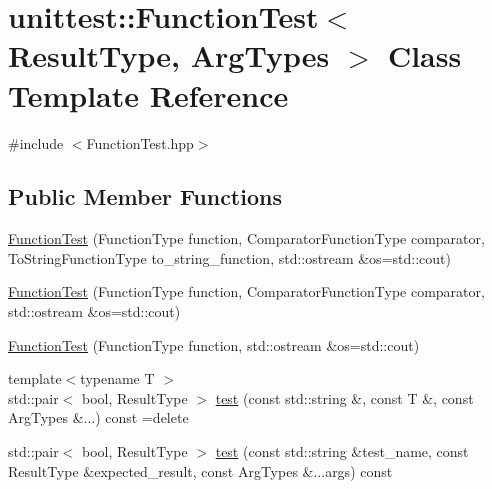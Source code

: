 \hypertarget{classunittest_1_1_function_test}{}\section{unittest\+:\+:Function\+Test$<$ Result\+Type, Arg\+Types $>$ Class Template Reference}
\label{classunittest_1_1_function_test}


{\ttfamily \#include $<$Function\+Test.\+hpp$>$}

\subsection*{Public Member Functions}
\begin{DoxyCompactItemize}
\item 
\hyperlink{classunittest_1_1_function_test_a9bb46bed56452a5354848e7d5744c715}{Function\+Test} (Function\+Type function, Comparator\+Function\+Type comparator, To\+String\+Function\+Type to\+\_\+string\+\_\+function, std\+::ostream \&os=std\+::cout)
\item 
\hyperlink{classunittest_1_1_function_test_addafa5fd128998c358ef14732d4afeb0}{Function\+Test} (Function\+Type function, Comparator\+Function\+Type comparator, std\+::ostream \&os=std\+::cout)
\item 
\hyperlink{classunittest_1_1_function_test_a27a92d51dc33cdd08f025555b3d73de8}{Function\+Test} (Function\+Type function, std\+::ostream \&os=std\+::cout)
\item 
{\footnotesize template$<$typename T $>$ }\\std\+::pair$<$ bool, Result\+Type $>$ \hyperlink{classunittest_1_1_function_test_abd6a6fe7f829fbedb7fdec63a61ed122}{test} (const std\+::string \&, const T \&, const Arg\+Types \&...) const  =delete
\item 
std\+::pair$<$ bool, Result\+Type $>$ \hyperlink{classunittest_1_1_function_test_a203c77334e047dd7a5399a5c97f28898}{test} (const std\+::string \&test\+\_\+name, const Result\+Type \&expected\+\_\+result, const Arg\+Types \&...args) const 
\end{DoxyCompactItemize}
